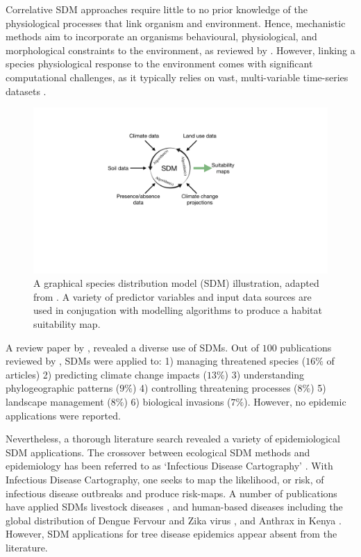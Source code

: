 Correlative SDM approaches require little to no prior knowledge of the physiological processes that link organism and environment.
Hence, mechanistic methods aim to incorporate an organisms behavioural, physiological, and morphological constraints to the environment, 
as reviewed by \cite{kearney2009mechanistic}. However, linking a species physiological response to the environment comes with significant
computational challenges, as it typically relies on vast, multi-variable time-series datasets \cite{shabani2016comparison}.

\begin{figure}
    \centering
    \includegraphics[scale=0.35]{chapter2/figures/SDM-fig.pdf}
    \caption{A graphical species distribution model (SDM) illustration, adapted from \cite{SDM_1}. 
             A variety of predictor variables and input data sources are used in conjugation with modelling algorithms to produce
             a habitat suitability map.}
    \label{fig:sdm}
\end{figure}

A review paper by \cite{guillera2015my}, revealed a diverse use of SDMs.
Out of $100$ publications reviewed by \cite{guillera2015my}, SDMs were applied to: 
1) managing threatened species ($16\% $ of articles) 
2) predicting climate change impacts ($13\%$) 
3) understanding phylogeographic patterns ($9\%$) 
4) controlling threatening processes ($8\%$) 
5) landscape management ($8\%$) 
6) biological invasions ($7\%$). However, no epidemic applications were reported.

Nevertheless, a thorough literature search revealed a variety of epidemiological SDM applications.
The crossover between ecological SDM methods and epidemiology has been referred to as `Infectious Disease Cartography' \cite{KRAEMER201619}.
With Infectious Disease Cartography, one seeks to map the likelihood, or risk, of infectious disease outbreaks and produce risk-maps.
A number of publications have applied SDMs livestock diseases \cite{hollings2017species}, and human-based diseases including the global 
distribution of Dengue Fervour \cite{bhatt2013global} and Zika virus \cite{messina2016mapping}, and Anthrax in Kenya \cite{otieno2021modeling}.
However, SDM applications for tree disease epidemics appear absent from the literature.

